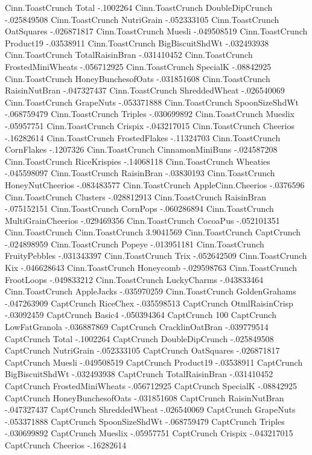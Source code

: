 Cinn.ToastCrunch	Total	-.1002264
Cinn.ToastCrunch	DoubleDipCrunch	-.025849508
Cinn.ToastCrunch	NutriGrain	-.052333105
Cinn.ToastCrunch	OatSquares	-.026871817
Cinn.ToastCrunch	Muesli	-.049508519
Cinn.ToastCrunch	Product19	-.03538911
Cinn.ToastCrunch	BigBiscuitShdWt	-.032493938
Cinn.ToastCrunch	TotalRaisinBran	-.031410452
Cinn.ToastCrunch	FrostedMiniWheats	-.056712925
Cinn.ToastCrunch	SpecialK	-.08842925
Cinn.ToastCrunch	HoneyBunchesofOats	-.031851608
Cinn.ToastCrunch	RaisinNutBran	-.047327437
Cinn.ToastCrunch	ShreddedWheat	-.026540069
Cinn.ToastCrunch	GrapeNuts	-.053371888
Cinn.ToastCrunch	SpoonSizeShdWt	-.068759479
Cinn.ToastCrunch	Triples	-.030699892
Cinn.ToastCrunch	Mueslix	-.05957751
Cinn.ToastCrunch	Crispix	-.043217015
Cinn.ToastCrunch	Cheerios	-.16282614
Cinn.ToastCrunch	FrostedFlakes	-.11324703
Cinn.ToastCrunch	CornFlakes	-.1207326
Cinn.ToastCrunch	CinnamonMiniBuns	-.024587208
Cinn.ToastCrunch	RiceKrispies	-.14068118
Cinn.ToastCrunch	Wheaties	-.045598097
Cinn.ToastCrunch	RaisinBran	-.03830193
Cinn.ToastCrunch	HoneyNutCheerios	-.083483577
Cinn.ToastCrunch	AppleCinn.Cheerios	-.0376596
Cinn.ToastCrunch	Clusters	-.028812913
Cinn.ToastCrunch	RaisinBran	-.075152151
Cinn.ToastCrunch	CornPops	-.060286894
Cinn.ToastCrunch	MultiGrainCheerios	-.029469356
Cinn.ToastCrunch	CocoaPus	-.052101351
Cinn.ToastCrunch	Cinn.ToastCrunch	3.9041569
Cinn.ToastCrunch	CaptCrunch	-.024898959
Cinn.ToastCrunch	Popeye	-.013951181
Cinn.ToastCrunch	FruityPebbles	-.031343397
Cinn.ToastCrunch	Trix	-.052642509
Cinn.ToastCrunch	Kix	-.046628643
Cinn.ToastCrunch	Honeycomb	-.029598763
Cinn.ToastCrunch	FrootLoops	-.049833212
Cinn.ToastCrunch	LuckyCharms	-.043833464
Cinn.ToastCrunch	AppleJacks	-.035970259
Cinn.ToastCrunch	GoldenGrahams	-.047263909
CaptCrunch	RiceChex	-.035598513
CaptCrunch	OtmlRaisinCrisp	-.03092459
CaptCrunch	Basic4	-.050394364
CaptCrunch	100%
CaptCrunch	LowFatGranola	-.036887869
CaptCrunch	CracklinOatBran	-.039779514
CaptCrunch	Total	-.1002264
CaptCrunch	DoubleDipCrunch	-.025849508
CaptCrunch	NutriGrain	-.052333105
CaptCrunch	OatSquares	-.026871817
CaptCrunch	Muesli	-.049508519
CaptCrunch	Product19	-.03538911
CaptCrunch	BigBiscuitShdWt	-.032493938
CaptCrunch	TotalRaisinBran	-.031410452
CaptCrunch	FrostedMiniWheats	-.056712925
CaptCrunch	SpecialK	-.08842925
CaptCrunch	HoneyBunchesofOats	-.031851608
CaptCrunch	RaisinNutBran	-.047327437
CaptCrunch	ShreddedWheat	-.026540069
CaptCrunch	GrapeNuts	-.053371888
CaptCrunch	SpoonSizeShdWt	-.068759479
CaptCrunch	Triples	-.030699892
CaptCrunch	Mueslix	-.05957751
CaptCrunch	Crispix	-.043217015
CaptCrunch	Cheerios	-.16282614
